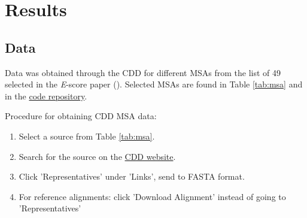 \chapter{Results}

\section{Data}
Data was obtained through the \gls{CDD} for different \glspl{MSA} from the list of 49 selected in the \textit{E}-score paper (\cite{Marchler-Bauer:2015, Ashrafzadeh:2023}). Selected \glspl{MSA} are found in Table \ref{tab:msa} and in the \href{https://github.com/rgavigan/e-score/tree/bf08fa86209a6ce9956d48212690b1814450e72b/data/finetuning/msa-proteins}{code repository}.

\begin{table} %
	\caption{10 MSAs with the most proteins from CDD used in the \textit{E}-score comparison procedure (\cite{Ashrafzadeh:2023, Marchler-Bauer:2015}).}
	\centering
    \vspace{2mm}
	\label{tab:msa}
\end{table}

\noindent Procedure for obtaining CDD MSA data:
\begin{enumerate}
    \item{Select a source from Table \ref{tab:msa}.}
    \item{Search for the source on the \href{https://www.ncbi.nlm.nih.gov/cdd}{CDD website}.}
    \item{Click 'Representatives' under 'Links', send to FASTA format.}
    \item{For reference alignments: click 'Download Alignment' instead of going to 'Representatives'}
\end{enumerate}

